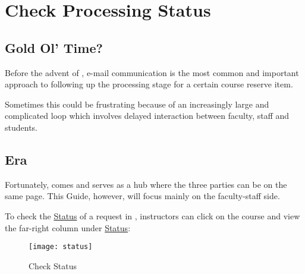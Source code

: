 \chapter{Check Processing Status}
\label{ch:status}
\section{Gold Ol' Time?}
Before the advent of \ares, e-mail communication is the most common and important approach to following up the processing stage for a certain course reserve item.

Sometimes this could be frustrating because of an increasingly large and complicated loop which involves delayed interaction between faculty, staff and students. 

\section{\ares Era}
Fortunately, \ares comes and serves as a hub where the three parties can be on the same page. This Guide, however, will focus mainly on the faculty-staff side.

To check the \uline{Status} of a request in \ares, instructors can click on the course and view the far-right column under \uline{Status}:
\vspace*{1.2ex}
\begin{figure}[h]
    \centering
    \texttt{[image: status]}
    \caption{Check Status}
    \label{fig:status}
\end{figure}
\vspace*{1ex}

